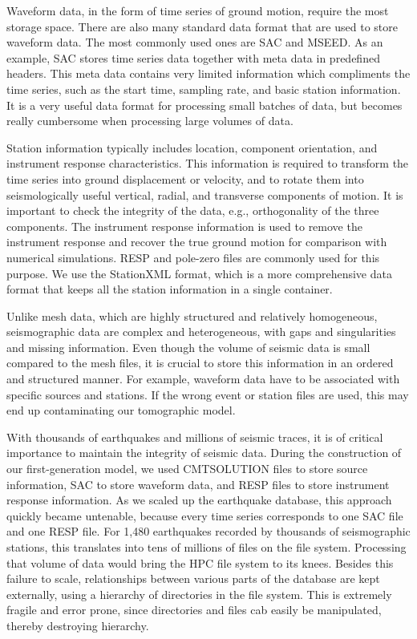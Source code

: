 Waveform data, in the form of time series of ground motion, require
the most storage space.
There are also many standard data format that are used to store waveform
data.
The most commonly used ones are SAC and MSEED.
As an example, SAC stores time series data together with meta data
in predefined headers.
This meta data contains very limited information
which compliments the time series, such as the start time, sampling rate,
and basic station
information.
It is a very useful data format for processing small batches of data, but becomes really cumbersome when processing
large volumes of data.

Station information typically includes location, component orientation, and instrument response characteristics.
This information is required to transform the time series into ground displacement or velocity, and to rotate them into seismologically useful vertical, radial, and transverse components of motion.
It is important to check the integrity of the data,
e.g., orthogonality of the three components.
The instrument response information is used to remove the instrument response and recover the true ground motion for comparison with numerical simulations.
RESP and pole-zero files are commonly used for this purpose.
We use the StationXML format,
which is a more comprehensive data format that keeps all the station information
in a single container.

Unlike mesh data, which are highly structured and relatively homogeneous,
seismographic data are complex and heterogeneous, with gaps and singularities and missing information.
Even though the volume of seismic data is small compared to the mesh files,
it is crucial to
store this information in an ordered and structured manner.
For example, 
waveform data have to be associated with specific sources and stations.
If the wrong
event or station files are used, this may end up contaminating our tomographic model.

With thousands of earthquakes and millions of seismic traces,
it is of critical importance to maintain the integrity of seismic data.
During the construction of our first-generation model,
we used CMTSOLUTION files to store source information,
SAC to store waveform data,
and RESP files to store instrument response information.
As we scaled up the earthquake database,
this approach quickly became untenable,
because every time series corresponds to one SAC file and one RESP file.
For 1,480 earthquakes recorded by thousands of seismographic stations,
this translates into tens of millions of files on the file system.
Processing that volume of data would bring the HPC file system to its knees.
Besides this failure to scale,
relationships between various parts of the database are kept externally,
using a hierarchy of directories in the file system.
This is extremely fragile and error prone,
since directories and files cab easily be manipulated,
thereby destroying hierarchy.

